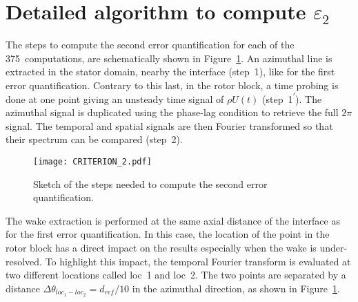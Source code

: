 \section{Detailed algorithm to compute \texorpdfstring{$\varepsilon_2$}{e2}}
\label{app:epsilon_2_steps}

The steps to compute
the second error quantification for each 
of the 375~computations, 
are schematically shown
in Figure~\ref{fig:CRITERION_2}. An azimuthal line is extracted
in the stator domain,
nearby the interface (step~\textcircled{\small{1}}), like
for the first error quantification. 
Contrary to this last, in the rotor
block, a time probing is done at one point 
giving an unsteady time
signal of $\rho U(t)$ (step~\textcircled{\small{1}}\textsuperscript{$\prime$}). 
The azimuthal signal is
duplicated using the phase-lag condition 
to retrieve the full $2 \pi$ signal. 
The temporal and spatial signals are then
Fourier transformed so that their spectrum can be compared (step~\textcircled{\small{2}}).
\begin{figure}[htp]
  \centering
  \texttt{[image: CRITERION\_2.pdf]}
  \caption{Sketch of the steps needed to compute 
  the second error quantification.}
  \label{fig:CRITERION_2}
\end{figure}
The wake extraction is performed at the same axial 
distance of the interface as 
for the first error quantification.
In this case, the location 
of the point in the rotor block has a direct impact on 
the results especially when the wake is under-resolved.
To highlight this impact, the temporal Fourier transform is 
evaluated at two different locations called loc~1 and 
loc~2. The two points are separated 
by a distance $\Delta \theta_{loc_1-loc_2} = d_{ref} / 10$ in the azimuthal direction, 
as shown in Figure~\ref{fig:CRITERION_2}.

